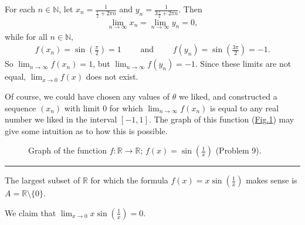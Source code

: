 \documentclass[letterpaper,10pt,english]{jupyterBook}
\let\sphinxpxdimen\pdfpxdimen\else\newdimen\sphinxpxdimen
\begin{document}
For each \(n\in\mathbb{N}\), let \(x_n=\frac{1}{\frac{\pi}{2} + 2\pi n}\) and \(y_n=\frac{1}{3\frac{\pi}{2} + 2\pi n}\). Then
\begin{equation*}
\begin{split}
\lim_{n\rightarrow\infty} x_{n} =\lim_{n\rightarrow\infty} y_n= 0,
\end{split}
\end{equation*}
\sphinxAtStartPar
while for all \(n\in\mathbb{N}\),
\begin{equation*}
\begin{split}
f(x_n) = \sin\left(\frac{\pi}{2}\right) =1 \hspace{2em} \text{ and } \hspace{2em} f(y_n)=\sin\left(\frac{3\pi}{2}\right)=-1.
\end{split}
\end{equation*}
\sphinxAtStartPar
So \(\lim_{n\rightarrow\infty} f(x_{n}) = 1\), but \(\lim_{n\rightarrow\infty} f(y_n) = -1\). Since these limits are not equal, \(\lim_{x\to 0} f(x)\) does not exist.

Of course, we could have chosen any values of \(\theta\) we liked, and constructed a sequence \((x_n)\) with limit \(0\) for which \(\lim_{n\rightarrow\infty}f(x_n)\) is equal to any real number we liked in the interval \([-1,1]\). The graph of this function (\hyperref[\detokenize{Solutions-full:s1x}]{Fig.\@ \ref{\detokenize{Solutions-full:s1x}}}) may give some intuition as to how this is possible.

\begin{figure}[htbp]
\centering
\capstart

\noindent\sphinxincludegraphics[width=700\sphinxpxdimen]{{sin(1,x)}.png}
\caption{Graph of the function \(f:\mathbb{R}\to\mathbb{R}\); \(f(x)=\sin\left(\frac{1}{x}\right)\) (Problem 9).}\label{\detokenize{Solutions-full:s1x}}\end{figure}


\bigskip\hrule\bigskip


\sphinxAtStartPar
{\hyperref[\detokenize{Problems:id10}]{}} The largest subset of \(\mathbb{R}\) for which the formula \(f(x)=x\sin\left(\frac{1}{x}\right)\) makes sense is \(A = \mathbb{R} \setminus \{0\}\).

We claim that \(\displaystyle\lim_{x \rightarrow 0} x \sin\left(\frac{1}{x}\right) = 0\).
\end{document}
